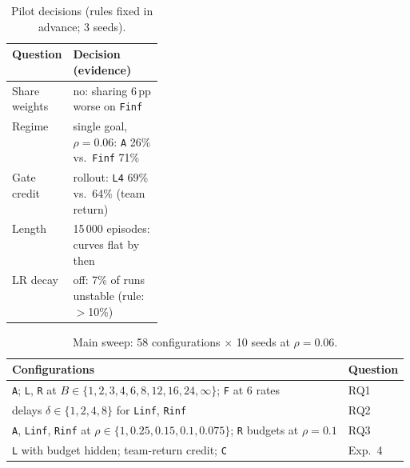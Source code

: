 \documentclass[twocolumn]{article}
\newcommand{\cfg}[1]{\texttt{#1}}
\begin{document}
\begin{table}[tb]
\centering\small
\caption{Pilot decisions (rules fixed in advance; 3 seeds).}
\label{tab:pilot}
\begin{tabularx}{\linewidth}{@{}>{\raggedright\arraybackslash}p{0.22\linewidth}X@{}}
\toprule
Question & Decision (evidence) \\
\midrule
Share weights & no: sharing 6\,pp worse on \cfg{Finf} \\
Regime & single goal, $\rho=0.06$: \cfg{A} 26\% vs.\ \cfg{Finf} 71\% \\
Gate credit & rollout: \cfg{L4} 69\% vs.\ 64\% (team return) \\
Length & 15\,000 episodes: curves flat by then \\
LR decay & off: 7\% of runs unstable (rule: $>$10\%) \\
\bottomrule
\end{tabularx}
\end{table}

\begin{table}[tb]
\centering\small
\caption{Main sweep: 58 configurations $\times$ 10 seeds at $\rho=0.06$.}
\label{tab:sweep}
\begin{tabularx}{\linewidth}{@{}>{\raggedright\arraybackslash}X l@{}}
\toprule
Configurations & Question \\
\midrule
\cfg{A}; \cfg{L}, \cfg{R} at $B\in\{1,2,3,4,6,8,12,16,24,\infty\}$; \cfg{F} at 6 rates & RQ1 \\
delays $\delta\in\{1,2,4,8\}$ for \cfg{Linf}, \cfg{Rinf} & RQ2 \\
\cfg{A}, \cfg{Linf}, \cfg{Rinf} at $\rho\in\{1,0.25,0.15,0.1,0.075\}$; \cfg{R} budgets at $\rho=0.1$ & RQ3 \\
\cfg{L} with budget hidden; team-return credit; \cfg{C} & Exp.~4 \\
\bottomrule
\end{tabularx}
\end{table}
\end{document}
